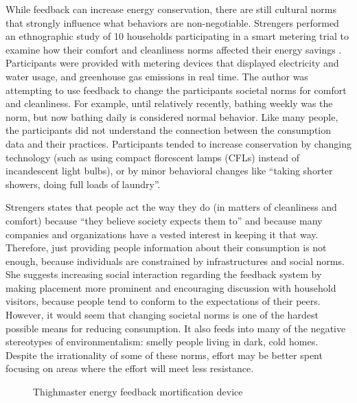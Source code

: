 While feedback can increase energy conservation, there are still cultural norms that strongly influence what behaviors are non-negotiable. Strengers performed an ethnographic study of 10 households participating in a smart metering trial to examine how their comfort and cleanliness norms affected their energy savings \cite{strengers-comfort-norms-2008}. Participants were provided with metering devices that displayed electricity and water usage, and greenhouse gas emissions in real time. The author was attempting to use feedback to change the participants societal norms for comfort and cleanliness. For example, until relatively recently, bathing weekly was the norm, but now bathing daily is considered normal behavior. Like many people, the participants did not understand the connection between the consumption data and their practices. Participants tended to increase conservation by changing technology (such as using compact florescent lamps (CFLs) instead of incandescent light bulbs), or by minor behavioral changes like ``taking shorter showers, doing full loads of laundry''.

Strengers states that people act the way they do (in matters of cleanliness and comfort) because ``they believe society expects them to'' and because many companies and organizations have a vested interest in keeping it that way. Therefore, just providing people information about their consumption is not enough, because individuals are constrained by infrastructures and social norms. She suggests increasing social interaction regarding the feedback system by making placement more prominent and encouraging discussion with household visitors, because people tend to conform to the expectations of their peers.
However, it would seem that changing societal norms is one of the hardest possible means for reducing consumption. It also feeds into many of the negative stereotypes of environmentalism: smelly people living in dark, cold homes. Despite the irrationality of some of these norms, effort may be better spent focusing on areas where the effort will meet less resistance.

\begin{figure}[htbp]
	\centering
		\caption{Thighmaster energy feedback mortification device}
		\label{fig:thighmaster}
\end{figure}

